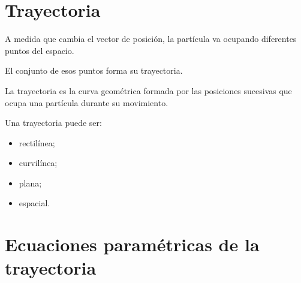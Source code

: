 \section{Trayectoria}

A medida que cambia el vector de posición, la partícula va ocupando diferentes
puntos del espacio.

El conjunto de esos puntos forma su trayectoria.

\begin{definicion}[Trayectoria]
La trayectoria es la curva geométrica formada por las posiciones sucesivas que
ocupa una partícula durante su movimiento.
\end{definicion}

Una trayectoria puede ser:

\begin{itemize}
    \item rectilínea;
    \item curvilínea;
    \item plana;
    \item espacial.
\end{itemize}

\begin{center}
\end{center}


\section{Ecuaciones paramétricas de la trayectoria}

